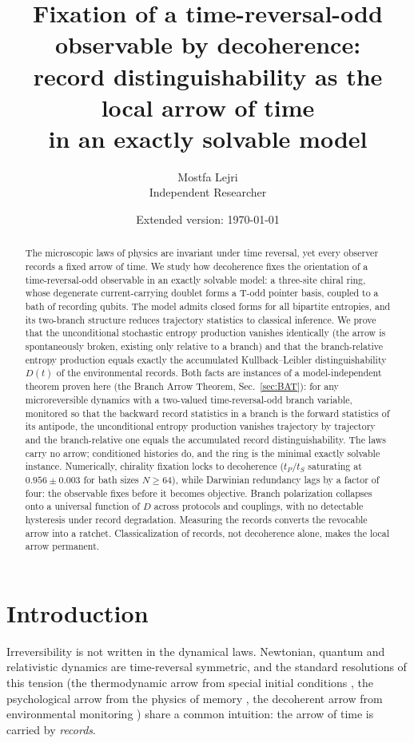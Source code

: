 \documentclass[11pt]{article}
\title{\bfseries Fixation of a time-reversal-odd observable by decoherence:\\
record distinguishability as the local arrow of time\\
in an exactly solvable model}
\author{Mostfa Lejri\\[2pt]
\small Independent Researcher}
\date{\small Extended version: \today}
\begin{document}
\maketitle

\begin{abstract}
\noindent
The microscopic laws of physics are invariant under time reversal, yet every observer records a fixed arrow of time. We study how decoherence fixes the orientation of a time-reversal-odd observable in an exactly solvable model: a three-site chiral ring, whose degenerate current-carrying doublet forms a T-odd pointer basis, coupled to a bath of recording qubits. The model admits closed forms for all bipartite entropies, and its two-branch structure reduces trajectory statistics to classical inference. We prove that the unconditional stochastic entropy production vanishes identically (the arrow is spontaneously broken, existing only relative to a branch) and that the branch-relative entropy production equals exactly the accumulated Kullback--Leibler distinguishability $D(t)$ of the environmental records. Both facts are instances of a model-independent theorem proven here (the Branch Arrow Theorem, Sec.~\ref{sec:BAT}): for any microreversible dynamics with a two-valued time-reversal-odd branch variable, monitored so that the backward record statistics in a branch is the forward statistics of its antipode, the unconditional entropy production vanishes trajectory by trajectory and the branch-relative one equals the accumulated record distinguishability. The laws carry no arrow; conditioned histories do, and the ring is the minimal exactly solvable instance. Numerically, chirality fixation locks to decoherence ($t_P/t_S$ saturating at $0.956\pm0.003$ for bath sizes $N\ge64$), while Darwinian redundancy lags by a factor of four: the observable fixes before it becomes objective. Branch polarization collapses onto a universal function of $D$ across protocols and couplings, with no detectable hysteresis under record degradation. Measuring the records converts the revocable arrow into a ratchet. Classicalization of records, not decoherence alone, makes the local arrow permanent.
\end{abstract}

\tableofcontents

\section{Introduction}

Irreversibility is not written in the dynamical laws. Newtonian, quantum and relativistic dynamics are time-reversal symmetric, and the standard resolutions of this tension (the thermodynamic arrow from special initial conditions \cite{Albert2000}, the psychological arrow from the physics of memory \cite{Mlodinow2014}, the decoherent arrow from environmental monitoring \cite{Zeh2007,Zurek2003,Guff2025}) share a common intuition: the arrow of time is carried by \emph{records}.
\end{document}
